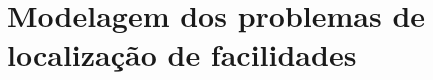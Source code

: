 \documentclass[]{article}
\title{}
\begin{document}
\maketitle

\begin{abstract}

\end{abstract}

\section{Modelagem dos problemas de localização de facilidades}
\end{document}
